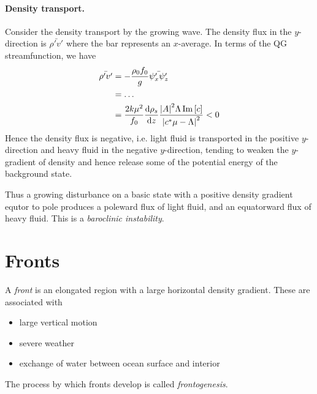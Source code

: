 \documentclass{jknotes}
\begin{document}
\paragraph{Density transport.}
Consider the density transport by the growing wave. The density flux in the
$y$-direction is $\bar{\rho' v'}$ where the bar represents an $x$-average. In
terms of the QG streamfunction, we have
\begin{align}
	\bar{\rho' v'} &= - \frac{\rho_0 f_0}{g}\bar{\psi'_x \psi'_z}\\
	&= \dots\\
	&= \frac{2k\mu^2}{f_0} \frac{\diffd \rho_s}{\diffd z} \frac{\abs{A}^2
\Lambda \Im\left[c\right]}{\abs{c^*\mu -\Lambda}^2} < 0
\end{align}
Hence the density flux is negative, i.e. light fluid is transported in the
positive $y$-direction and heavy fluid in the negative $y$-direction, tending
to weaken the $y$-gradient of density and hence release some of the potential
energy of the background state.

Thus a growing disturbance on a basic state with a positive density gradient
equtor to pole produces a poleward flux of light fluid, and an equatorward
flux of heavy fluid. This is a \emph{baroclinic instability}. 

\section{Fronts}
A \emph{front} is an elongated region with a large horizontal density
gradient. These are associated with
\begin{itemize}
	\item large vertical motion
	\item severe weather
	\item exchange of water between ocean surface and interior
\end{itemize}

The process by which fronts develop is called \emph{frontogenesis}.
\end{document}
